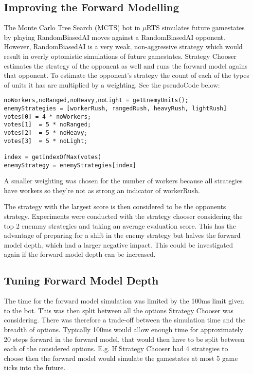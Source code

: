 \documentclass[]{article}
\begin{document}
\subsection{Improving the Forward Modelling}
The Monte Carlo Tree Search (MCTS) bot in $\mu$RTS simulates future gamestates by playing RandomBiasedAI moves against a RandomBiasedAI opponent. However, RandomBiasedAI is a very weak, non-aggressive strategy which would result in overly optomistic simulations of future gamestates. Strategy Chooser estimates the strategy of the opponent as well and runs the forward model agains that opponent. To estimate the opponent's strategy the count of each of the types of units it has are multiplied by a weighting. See the pseudoCode below:
\begin{lstlisting}
noWorkers,noRanged,noHeavy,noLight = getEnemyUnits();
enemyStrategies = [workerRush, rangedRush, heavyRush, lightRush]
votes[0] = 4 * noWorkers;
votes[1]  = 5 * noRanged;
votes[2]  = 5 * noHeavy;
votes[3]  = 5 * noLight;

index = getIndexOfMax(votes)
enemyStrategy = enemyStrategies[index]
\end{lstlisting}
A smaller weighting was chosen for the number of workers because all strategies have workers so they're not as strong an indicator of workerRush. 

The strategy with the largest score is then considered to be the opponents strategy. Experiments were conducted with the strategy chooser considering the top 2 enemmy strategies and taking an average evaluation score. This has the advantage of preparing for a shift in the enemy strategy but halves the forward model depth, which had a larger negative impact. This could be investigated again if the forward model depth can be increased.

\subsection{Tuning Forward Model Depth}
The time for the forward model simulation was limited by the 100ms limit given to the bot. This was then split between all the options Strategy Chooser was considering. There was therefore a trade-off between the simulation time and the breadth of options. Typically 100ms would allow enough time for approximately 20 steps forward in the forward model, that would then have to be split between each of the considered options. E.g. If Strategy Chooser had 4 strategies to choose then the forward model would simulate the gamestates at most 5 game ticks into the future.  
\end{document}
